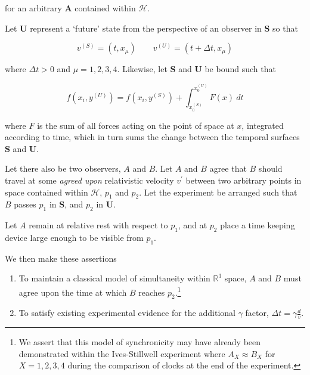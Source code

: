 \documentclass[pdflatex,sn-mathphys-num]{sn-jnl}%
\theoremstyle{thmstyleone}%
\theoremstyle{thmstyletwo}%
\theoremstyle{thmstylethree}%
\begin{document}
for an arbitrary $\mathbf{A}$ contained within $\mathcal{H}$.

Let $\mathbf{U}$ represent a `future' state from the perspective of an observer in $\mathbf{S}$ so that


\begin{equation}
    v^{\left( S \right)} = \left( t, x_{\mu} \right) \qquad v^{\left( U \right)} = \left( t + \Delta t, x_{\mu} \right)
\end{equation}

where $\Delta t > 0$ and $\mu = 1, 2, 3, 4$. Likewise, let $\mathbf{S}$ and $\mathbf{U}$ be bound such that 

\begin{equation}
    f\left( x_{i}, y^{\left( U \right)} \right) = f\left( x_{i}, y^{\left( S \right)} \right) + \int_{x_{0}^{\left( S \right)}}^{x_{0}^{\left( U \right)}} F\left( x \right)\ dt
\end{equation}

where $F$ is the sum of all forces acting on the point of space at $x$, integrated according to time, which in turn sums the change between the temporal surfaces $\mathbf{S}$ and $\mathbf{U}$.

Let there also be two observers, $A$ and $B$. Let $A$ and $B$ agree that $B$ should travel at some \textit{agreed upon} relativistic velocity $v^{\prime}$ between two arbitrary points in space contained within $\mathcal{H}$, $p_{1}$ and $p_{2}$. Let the experiment be arranged such that $B$ passes $p_{1}$ in $\mathbf{S}$, and $p_{2}$ in $\mathbf{U}$.

Let $A$ remain at relative rest with respect to $p_{1}$, and at $p_{2}$ place a time keeping device large enough to be visible from $p_{1}$. 

We then make these assertions

\begin{enumerate}[1.]
\item To maintain a classical model of simultaneity within $\mathbb{R}^{3}$ space, $A$ and $B$ must agree upon the time at which $B$ reaches $p_{2}$.\footnote{We assert that this model of synchronicity may have already been demonstrated within the Ives-Stillwell experiment\cite{IvesStillwell} where $A_{X} \approx B_{X}$ for $X = 1, 2, 3, 4$ during the comparison of clocks at the end of the experiment.}
\item To satisfy existing experimental evidence for the additional $\gamma$ factor\cite{Rossi1941, FrischSmith1963, Bailey1977, Bailey1979, Botermann2014}, $\Delta t = \gamma \frac{d}{v}$.
\end{enumerate}
\end{document}
